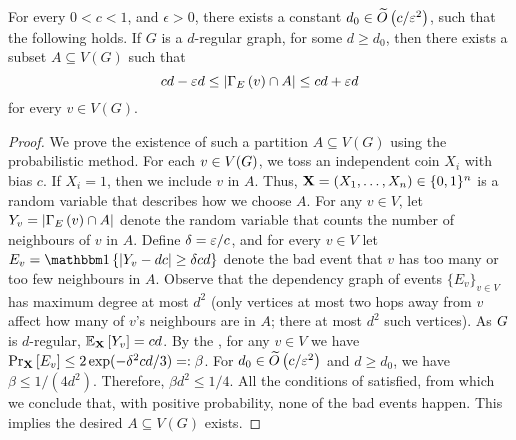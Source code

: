 \documentclass[11pt]{article}
\begin{document}
\begin{lemma} \label{thm:partition}
For every $0 < c < 1$, and $\epsilon > 0$, there exists a constant $d_0 \in \BigOTilde{c/\epsilon^2}$, such that the following holds. If $G$ is a $d$-regular graph, for some $d \ge d_0$, then there exists a subset $A \subseteq V(G)$ such that
$$
    cd - \epsilon d \leq \left| \Neighbourhood{E}{v} \cap A \right| \leq cd + \epsilon d 
$$
for every $v \in V(G)$.
\end{lemma}
\begin{proof}
We prove the existence of such a partition $A \subseteq V(G)$ using the probabilistic method.
For each $v \in \Vertices{\Graph}$, we toss an independent coin $X_i$ with bias $c$.
If $X_i = 1$, then we include $v$ in $A$. Thus, $\vec{X} \Def (X_1, \dots, X_n) \in \bit^n$ is a random variable that describes how we choose $A$. For any $v \in V$, let $Y_v \Def |\Neighbourhood{E}{v} \cap \RedA|$ denote the random variable that counts the number of neighbours of $v$ in $A$.
Define $\delta \Def \epsilon / c$, and for every $v \in V$ let $E_v = \Indicator{|Y_v - d c | \geq \delta c d}$ denote the bad event that $v$ has too many or too few neighbours in $A$.
Observe that the dependency graph of events $\{ E_v \}_{v \in V}$ has maximum degree at most $d^2$ (only vertices at most two hops away from $v$ affect how many of $v$'s neighbours are in $A$; there at most $d^2$ such vertices).
As $\Graph$ is $d$-regular, $\Mean{\vec{X}}{Y_v} = c d$. By the , for any $v \in V$ we have $\PProb{E_v}{\vec{X}} \leq 2\exp(-\delta^2c d/3) =: \beta$.
For $d_0 \in \BigOTilde{c/\epsilon^2}$ and $d \ge d_0$, we have $\beta \leq 1/(4d^2)$.
Therefore, $\beta d^2 \leq 1/4$. All the conditions of  satisfied, from which we conclude that, with positive probability, none of the bad events happen. This implies the desired $A \subseteq V(G)$ exists.
\end{proof}
\end{document}

